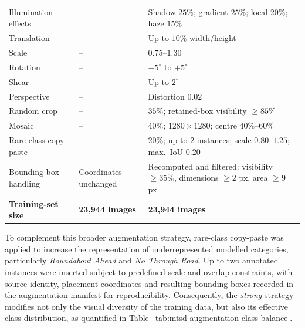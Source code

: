 \begin{table}[h]
\begin{tabularx}{\textwidth}{
    @{}
    >{\raggedright\arraybackslash}p{3.4cm}
    >{\raggedright\arraybackslash}p{4.3cm}
    >{\raggedright\arraybackslash}X
    @{}
}
\addlinespace[0.15em]

Illumination effects
& --
& Shadow \(25\%\); gradient \(25\%\); local \(20\%\); haze \(15\%\) \\

Translation
& --
& Up to \(10\%\) width/height \\

Scale
& --
& \(0.75\)--\(1.30\) \\

Rotation
& --
& \(-5^{\circ}\) to \(+5^{\circ}\) \\

Shear
& --
& Up to \(2^{\circ}\) \\

Perspective
& --
& Distortion \(0.02\) \\

Random crop
& --
& \(35\%\); retained-box visibility \(\geq 85\%\) \\

\addlinespace[0.15em]

Mosaic
& --
& \(40\%\); \(1280 \times 1280\); centre \(40\%\)--\(60\%\) \\

Rare-class copy-paste
& --
& \(20\%\); up to 2 instances; scale \(0.80\)--\(1.25\); max.\ \gls{IoU} \(0.20\) \\

\addlinespace[0.15em]

Bounding-box handling
& Coordinates unchanged
& Recomputed and filtered: visibility \(\geq 35\%\), dimensions \(\geq 2\) px, area \(\geq 9\) px \\

\midrule

\textbf{Training-set size}
& \textbf{23,944 images}
& \textbf{23,944 images} \\

\bottomrule
\end{tabularx}
\end{table}

\newpage
\noindent To complement this broader augmentation strategy, rare-class copy-paste was applied to increase the representation of underrepresented modelled categories, particularly \emph{Roundabout Ahead} and \emph{No Through Road}. Up to two annotated instances were inserted subject to predefined scale and overlap constraints, with source identity, placement coordinates and resulting bounding boxes recorded in the augmentation manifest for reproducibility. Consequently, the \emph{strong} strategy modifies not only the visual diversity of the training data, but also its effective class distribution, as quantified in Table~\ref{tab:mtsd-augmentation-class-balance}.

